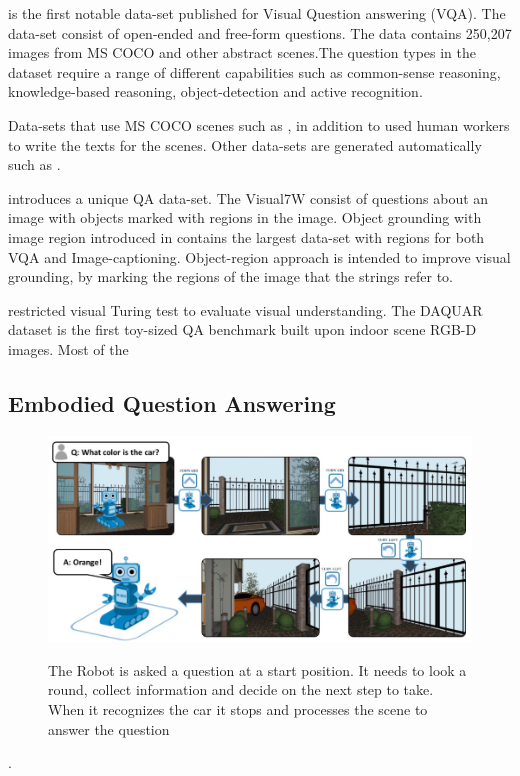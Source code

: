  \cite{VQA} is the first notable data-set published for Visual Question answering (VQA). The data-set consist of open-ended and free-form questions. The data contains 250,207 images from MS COCO \cite{lin2015microsoft} and other abstract scenes.The question types in the dataset require a range of different capabilities such as common-sense reasoning, knowledge-based reasoning, object-detection and active recognition.
 
 Data-sets that use MS COCO scenes such as \cite{gao2015talking}, \cite{yu2015visual} in addition to \cite{VQA} used human workers to write the texts for the scenes. Other data-sets are generated automatically such as \cite{ren2015exploring}. 


\cite{zhu2016visual7w} introduces a  unique QA data-set. The Visual7W consist of questions about an image with objects marked with regions in the image. Object grounding with image region introduced in \cite{krishna2016visual} contains the largest data-set with regions for both VQA and Image-captioning. Object-region approach is intended to improve visual grounding, by marking the regions of the image that the strings refer to.

restricted visual Turing test to evaluate visual understanding. The DAQUAR dataset is the first toy-sized QA benchmark built upon indoor scene RGB-D images. Most of the

\subsection{Embodied Question Answering}

\begin{figure}[H]
\includegraphics[scale=0.4]{latex/images/EmbodiedQuestionAnswering.png}
\label{fig:EQA}
\caption{The Robot is asked a question at a start position. It needs to look a round, collect information and decide on the next step to take. When it recognizes the car it stops and processes the scene to answer the question }
\end{figure}. 

